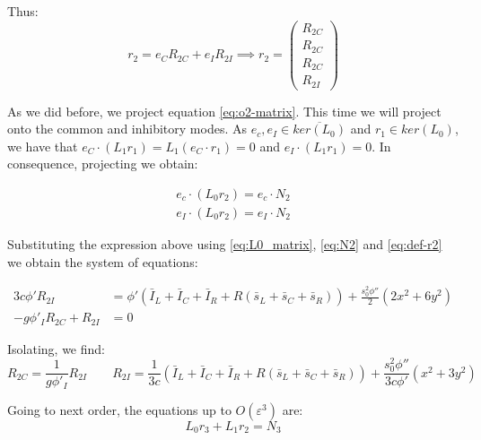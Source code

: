 \documentclass[../main.tex]{subfiles}
\begin{document}
Thus:
\begin{equation}
r_2 = e_CR_{2C} + e_IR_{2I} 
 \implies
r_{2} = \begin{pmatrix}R_{2C}\\R_{2C}\\R_{2C}\\R_{2I} \end{pmatrix}
\label{eq:def-r2}
\end{equation}


As we did before, we project equation \eqref{eq:o2-matrix}. This time we will project onto the common and inhibitory modes. As $e_c, e_I \in \overline{ker(L_0)}$ and $r_1\in ker(L_0)$, we have that $e_C\cdot(L_1r_1)=L_1(e_C\cdot r_1) = 0$ and $e_I\cdot (L_1r_1)=0$. In consequence, projecting we obtain:

\begin{equation}
\begin{aligned}
 e_c \cdot (L_0r_2 ) =  e_c \cdot  N_2\\[8pt]
 e_I  \cdot  (L_0r_2 )=  e_I \cdot  N_2
\end{aligned}
\end{equation}


Substituting the expression above using \eqref{eq:L0_matrix}, \eqref{eq:N2} and \eqref{eq:def-r2} we obtain the system of equations:

\begin{equation}
\begin{aligned}
3c\phi'R_{2I}  &= \phi'(\bar{I}_L+\bar{I}_C+\bar{I}_R + R(\bar{s}_L+ \bar{s}_C+ \bar{s}_R) )+ \frac{s_0^2\phi''}{2}\left(2x^2+6y^2 \right)\\[8pt]
-g\phi'_I R_{2C} +R_{2I} &= 0
\end{aligned}
\label{eq:}
\end{equation}


Isolating, we find:
\[
R_{2C} = \frac{1}{g\phi'_I}R_{2I} \qquad R_{2I} = \frac{1}{3c}(\bar{I}_L+\bar{I}_C+\bar{I}_R + R(\bar{s}_L+ \bar{s}_C+ \bar{s}_R))+ \frac{s_0^2\phi''}{3c\phi'}(x^2+3y^2)
\]

Going to next order, the equations up to $O(\varepsilon^3)$ are:
\begin{equation}
L_0r_3 + L _{1} r_{2} = N _{3}
\label{eq:o3-matrix}
\end{equation}
\end{document}

